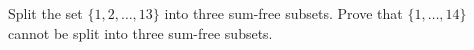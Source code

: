 Split the set $\{1, 2, \ldots, 13\}$ into three sum-free subsets. Prove that $\{1, \ldots, 14\}$ cannot be split into three sum-free subsets.
